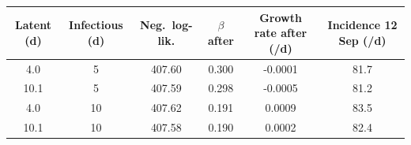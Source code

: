 \begin{tabular}{@{}cccccc@{}}
\toprule
Latent (d) & Infectious (d) & Neg.\ log-lik. & $\beta$ after & Growth rate after (/d) & Incidence 12 Sep (/d) \\
\midrule
4.0 & 5 & 407.60 & 0.300 & -0.0001 & 81.7 \\
10.1 & 5 & 407.59 & 0.298 & -0.0005 & 81.2 \\
4.0 & 10 & 407.62 & 0.191 & 0.0009 & 83.5 \\
10.1 & 10 & 407.58 & 0.190 & 0.0002 & 82.4 \\
\bottomrule
\end{tabular}
